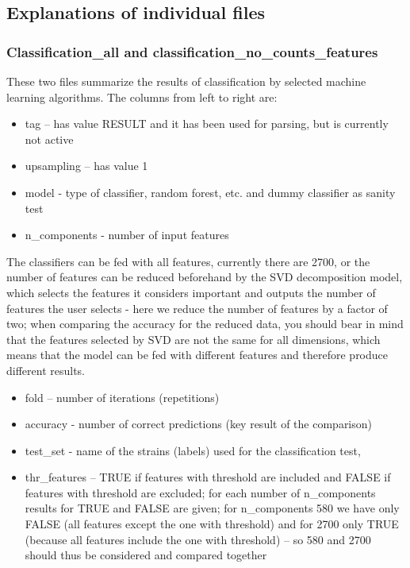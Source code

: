 \documentclass{ol-softwaremanual}
\begin{document}
\subsection{Explanations of individual files}

\subsubsection{Classification\_all and classification\_no\_counts\_features}

These two files summarize the results of classification by selected machine learning algorithms. The columns from left to right are:
\begin{itemize}
	\item tag – has value RESULT and it has been used for parsing, but is currently not active
	\item upsampling – has value 1 
	\item model - type of classifier, random forest, etc. and dummy classifier as sanity test 
	\item n\_components - number of input features 
\end{itemize}


The classifiers can be fed with all features, currently there are 2700, or the number of features can be reduced beforehand by the SVD decomposition model, which selects the features it considers important and outputs the number of features the user selects - here we reduce the number of features by a factor of two; when comparing the accuracy for the reduced data, you should bear in mind that the features selected by SVD are not the same for all dimensions, which means that the model can be fed with different features and therefore produce different results.
\begin{itemize}
	\item fold – number of iterations (repetitions)
	\item accuracy - number of correct predictions (key result of the comparison)
	\item test\_set - name of the strains (labels) used for the classification test, 
	\item thr\_features – TRUE if features with threshold are included and FALSE if features with threshold are excluded; for each number of n\_components results for TRUE and FALSE are given; for n\_components 580 we have only FALSE (all features except the one with threshold) and for 2700 only TRUE (because all features include the one with threshold) – so 580 and 2700 should thus be considered and compared together
\end{itemize}
\end{document}
